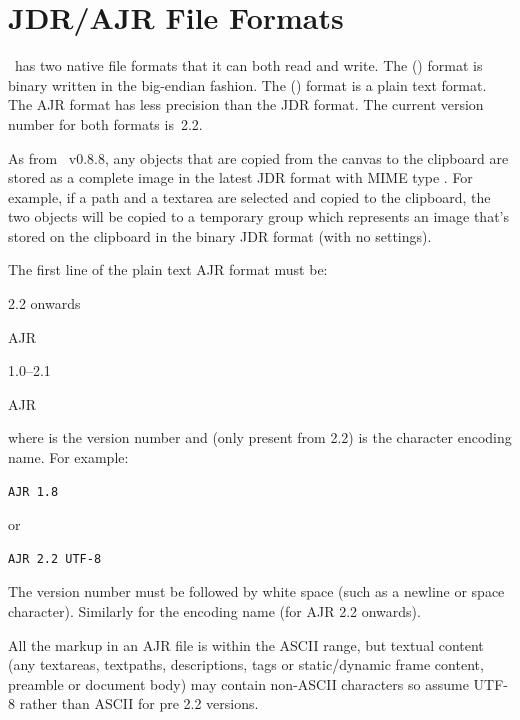 \chapter{JDR/AJR File Formats}\label{sec:jdrajrformat}

\FlowframTk\ has two native file formats that it can both read and
write. The  () format is binary written
in the big-endian fashion. The  () format is
a plain text format. The \gls*{AJR} format has less precision than the
\gls*{JDR} format. The current version number for both formats
is~2.2.

\begin{information}
As from \FlowframTk\ v0.8.8, any \glspl{object} that are copied
from the \gls{canvas} to the clipboard are stored as a complete
image in the latest \gls{JDR} format with MIME type
.
For example, if a \gls{path} and a \gls{textarea} are selected and
copied to the clipboard, the two objects will be copied to a
temporary \gls{group} which represents an image that's stored
on the clipboard in the binary \gls{JDR} format (with no settings).
\end{information}

The first line of the plain text \gls*{AJR} format must be:
\begin{jdrversion}{2.2 onwards}
\begin{compactcodebox}
AJR  
\end{compactcodebox}
\end{jdrversion}
\begin{jdrversion}{1.0--2.1}
\begin{compactcodebox}
AJR 
\end{compactcodebox}
\end{jdrversion}
where  is the version number and 
(only present from 2.2) is the character encoding name. For example:
\begin{verbatim}
AJR 1.8
\end{verbatim}
or
\begin{verbatim}
AJR 2.2 UTF-8
\end{verbatim}
The version number must be followed by white space (such as a
newline or space character). Similarly for the encoding name (for
AJR 2.2 onwards).

\begin{information}
All the markup in an \gls{AJR} file is within the ASCII range, but
textual content (any \glspl{textarea}, \glspl{textpath},
descriptions, tags or static/dynamic frame content, preamble or
document body) may contain non-ASCII characters so assume UTF-8 
rather than ASCII for pre 2.2 versions.
\end{information}

